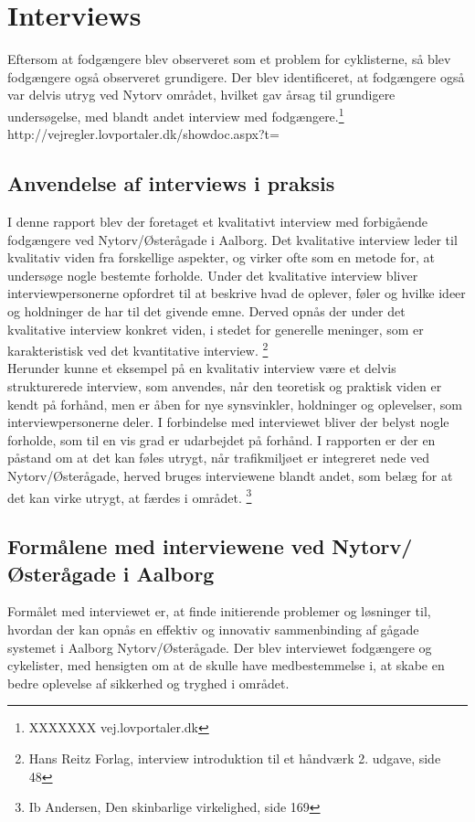 \documentclass{report}
\begin{document}
\section{Interviews}
Eftersom at fodgængere blev observeret som et problem for cyklisterne, så blev fodgængere også observeret grundigere. Der blev identificeret, at fodgængere også var delvis utryg ved Nytorv området, hvilket gav årsag til grundigere undersøgelse, med blandt andet interview med fodgængere.\footnote{XXXXXXX vej.lovportaler.dk} http://vejregler.lovportaler.dk/showdoc.aspx?t=%


\subsection{Anvendelse af interviews i praksis}
I denne rapport blev der foretaget et kvalitativt interview med forbigående fodgængere ved Nytorv/Østerågade i Aalborg. Det kvalitative interview leder til kvalitativ viden fra forskellige aspekter, og virker ofte som en metode for, at undersøge nogle bestemte forholde. Under det kvalitative interview bliver interviewpersonerne opfordret til at beskrive hvad de oplever, føler og hvilke ideer og holdninger de har til det givende emne. Derved opnås der under det kvalitative interview konkret viden, i stedet for generelle meninger, som er karakteristisk ved det kvantitative interview. \footnote{ Hans Reitz Forlag, interview introduktion til et håndværk 2. udgave, side 48}
\\  

Herunder kunne et eksempel på en kvalitativ interview være et delvis strukturerede interview, som anvendes, når den teoretisk og praktisk viden er kendt på forhånd, men er åben for nye synsvinkler, holdninger og oplevelser, som interviewpersonerne deler. I forbindelse med interviewet bliver der belyst nogle forholde, som til en vis grad er udarbejdet på forhånd. I rapporten er der en påstand om at det kan føles utrygt, når trafikmiljøet er integreret nede ved Nytorv/Østerågade, herved bruges interviewene blandt andet, som belæg for at det kan virke utrygt, at færdes i området. \footnote{Ib Andersen, Den skinbarlige virkelighed, side 169}


\subsection{Formålene med interviewene ved Nytorv/Østerågade i Aalborg}
Formålet med interviewet er, at finde initierende problemer og løsninger til, hvordan der kan opnås en effektiv og innovativ sammenbinding af gågade systemet i Aalborg Nytorv/Østerågade. Der blev interviewet fodgængere og cykelister, med hensigten om at de skulle have medbestemmelse i, at skabe en bedre oplevelse af sikkerhed og tryghed i området. 
\\
\end{document}
